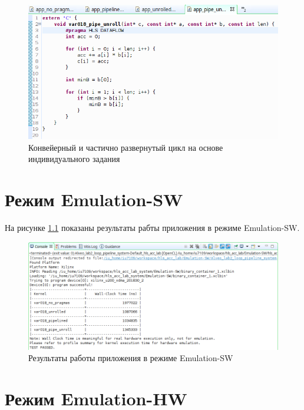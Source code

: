 \begin{figure}[H]
	\begin{center}
		\includegraphics[scale=0.6]{img/pipe_unroll.png}
	\end{center}
	\captionsetup{justification=centering}
	\caption{Конвейерный и частично развернутый цикл
на основе индивидуального задания}
	\label{img:pipe_unroll}
\end{figure}

\chapter{Режим Emulation-SW}

На рисунке \ref{img:sw} показаны результаты рабты приложения в режиме Emulation-SW.

\begin{figure}[H]
	\begin{center}
		\includegraphics[scale=0.5]{img/sw.png}
	\end{center}
	\captionsetup{justification=centering}
	\caption{Результаты работы приложения в режиме Emulation-SW}
	\label{img:sw}
\end{figure}

\chapter{Режим Emulation-HW}

